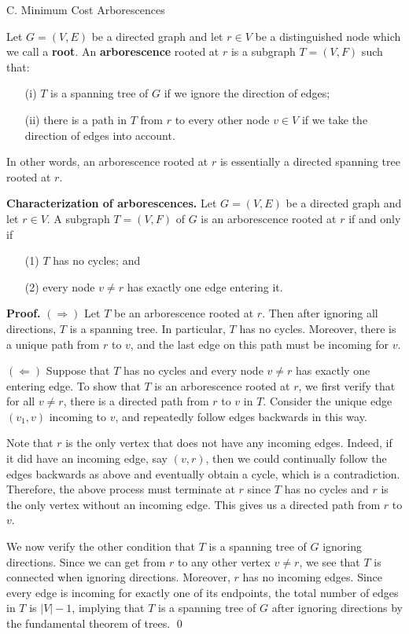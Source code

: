 \documentclass{article}
\begin{document}
\newpage
\begin{center}
    {\sc C. Minimum Cost Arborescences}
\end{center}

Let $G = (V, E)$ be a directed graph and let $r \in V$ be a distinguished 
node which we call a {\bf root}. 
An {\bf arborescence} rooted at $r$ is a subgraph $T = (V, F)$ such that: 
\begin{enumerate}
    \item [(i)] $T$ is a spanning tree of $G$ if we ignore the direction of edges; 
    \item [(ii)] there is a path in $T$ from $r$ to every other node $v \in V$ 
    if we take the direction of edges into account. 
\end{enumerate}
In other words, an arborescence rooted at $r$ is essentially a directed spanning tree 
rooted at $r$. 

{\color{violet}
{\bf Characterization of arborescences.} Let $G = (V, E)$ 
be a directed graph and let $r \in V$. A subgraph $T = (V, F)$ of $G$ is 
an arborescence rooted at $r$ if and only if 
\begin{enumerate}
    \item [(1)] $T$ has no cycles; and 
    \item [(2)] every node $v \neq r$ has exactly one edge entering it. 
\end{enumerate}
}

{\color{blue} 
{\bf Proof.} $(\Rightarrow)$ Let $T$ be an arborescence rooted at $r$. Then 
after ignoring all directions, $T$ is a spanning tree. In particular, 
$T$ has no cycles. Moreover, there is a unique path from $r$ to $v$, and the 
last edge on this path must be incoming for $v$.

$(\Leftarrow)$ Suppose that $T$ has no cycles and every node $v \neq r$ 
has exactly one entering edge. To show that $T$ is an arborescence rooted at 
$r$, we first verify that for all $v \neq r$, there is a directed path from $r$ to 
$v$ in $T$. Consider the unique edge $(v_1, v)$ incoming to $v$, 
and repeatedly follow edges backwards in this way.

Note that $r$ is the only vertex that does not have any incoming edges. 
Indeed, if it did have an incoming edge, say $(v, r)$, then 
we could continually follow the edges backwards as above and 
eventually obtain a cycle, which is a contradiction. Therefore, 
the above process must terminate at $r$ since $T$ has no cycles and $r$ is the only vertex without an 
incoming edge. This gives us a directed path from $r$ to $v$. 

We now verify the other condition that $T$ is a spanning tree of $G$ 
ignoring directions. Since we can get from $r$ to any other vertex $v \neq r$, 
we see that $T$ is connected when ignoring directions. Moreover, $r$ 
has no incoming edges. Since every edge is incoming for exactly 
one of its endpoints, the total number of edges in $T$ is $|V| - 1$, 
implying that $T$ is a spanning tree of $G$ after ignoring directions 
by the fundamental theorem of trees. \qed 
}
\end{document}
